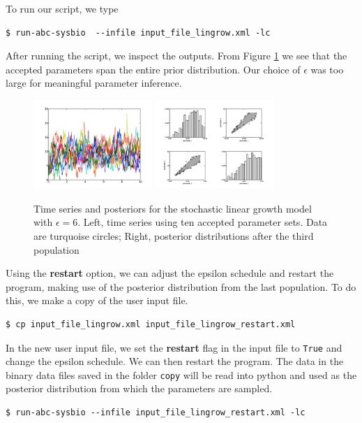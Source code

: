 \documentclass[a4paper]{report}
\begin{document}
To run our script, we type
\begin{verbatim}
$ run-abc-sysbio  --infile input_file_lingrow.xml -lc
\end{verbatim}
After running the script, we inspect the outputs.  From Figure \ref{LinGrow1} we see that the accepted parameters span the entire prior distribution. Our choice of $\epsilon$ was too large for meaningful parameter inference. 
\begin{figure}[htbp]
\centering
\includegraphics[width=0.4\textwidth]{Graphics/TimeSeriesLinGrow1.png}
\includegraphics[width=0.4\textwidth]{Graphics/ScatterPlotsLinGrow1.png}
\caption{Time series and posteriors for the stochastic linear growth model with $\epsilon = 6$. Left, time series using ten accepted parameter sets. Data are turquoise circles; Right, posterior distributions after the third population \label{LinGrow1}}
\end{figure}
Using the \textbf{restart} option, we can adjust the epsilon schedule and restart the program, making use of the posterior distribution from the last population. To do this, we make a copy of the user input file.
\begin{verbatim}
$ cp input_file_lingrow.xml input_file_lingrow_restart.xml
\end{verbatim}
In the new user input file, we set the \textbf{restart} flag in the input file to \verb$True$ and change the epsilon schedule. We can then restart the program. The data in the binary data files saved in the folder \verb$copy$ will be read into python and used as the posterior distribution from which the parameters are sampled.
\begin{verbatim}
$ run-abc-sysbio --infile input_file_lingrow_restart.xml -lc
\end{verbatim}
\end{document}

